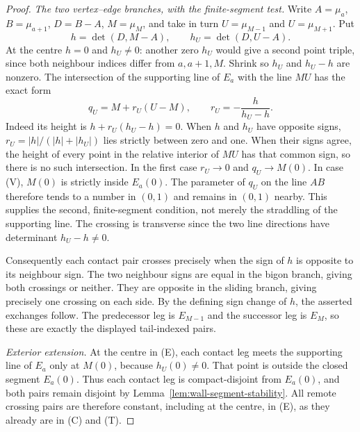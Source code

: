\begin{proof}
\emph{The two vertex--edge branches, with the finite-segment test.}
Write $A=\mu_a$, $B=\mu_{a+1}$, $D=B-A$, $M=\mu_M$, and take in turn
$U=\mu_{M-1}$ and $U=\mu_{M+1}$. Put
\begin{equation}\label{wallgeo:heights}
 h=\det(D,M-A),\qquad h_U=\det(D,U-A).
\end{equation}
At the centre $h=0$ and $h_U\ne0$: another zero $h_U$ would give a second
point triple, since both neighbour indices differ from $a,a+1,M$.
Shrink so $h_U$ and $h_U-h$ are nonzero. The intersection of the supporting
line of $E_a$ with the line $MU$ has the exact form
\begin{equation}\label{wallgeo:contact-foot}
 q_U=M+r_U(U-M),\qquad r_U=-\frac{h}{h_U-h}.
\end{equation}
Indeed its height is $h+r_U(h_U-h)=0$. When $h$ and $h_U$ have opposite
signs, $r_U=|h|/(|h|+|h_U|)$ lies strictly between zero and one. When their
signs agree, the height of every point in the relative interior of $MU$ has
that common sign, so there is no such intersection. In the first case
$r_U\to0$ and $q_U\to M(0)$. In case (V), $M(0)$ is strictly inside $E_a(0)$.
The parameter of $q_U$ on the line $AB$ therefore tends to a number in $(0,1)$
and remains in $(0,1)$ nearby. This supplies the second, finite-segment
condition, not merely the straddling of the supporting line. The crossing is
transverse since the two line directions have determinant $h_U-h\ne0$.

Consequently each contact pair crosses precisely when the sign of $h$ is
opposite to its neighbour sign. The two neighbour signs are equal in the
bigon branch, giving both crossings or neither. They are opposite in the
sliding branch, giving precisely one crossing on each side. By the defining
sign change of $h$, the asserted exchanges follow. The predecessor leg is
$E_{M-1}$ and the successor leg is $E_M$, so these are exactly the displayed
tail-indexed pairs.

\emph{Exterior extension.}
At the centre in (E), each contact leg meets the supporting line of $E_a$
only at $M(0)$, because $h_U(0)\ne0$. That point is outside the closed
segment $E_a(0)$. Thus each contact leg is compact-disjoint from $E_a(0)$,
and both pairs remain disjoint by Lemma~\ref{lem:wall-segment-stability}.
All remote crossing pairs are therefore constant, including at the centre,
in (E), as they already are in (C) and (T).


\end{proof}
